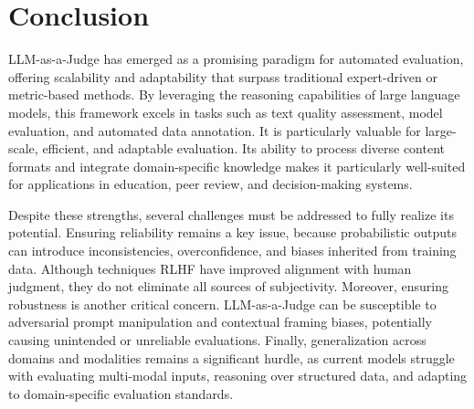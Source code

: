 \documentclass[acmsmall,screen]{acmart}
\begin{document}
\section{Conclusion}\label{sec:conclusion}


LLM-as-a-Judge has emerged as a promising paradigm for automated evaluation, offering scalability and adaptability that surpass traditional expert-driven or metric-based methods. By leveraging the reasoning capabilities of large language models, this framework excels in tasks such as text quality assessment, model evaluation, and automated data annotation. It is particularly valuable for large-scale, efficient, and adaptable evaluation. Its ability to process diverse content formats and integrate domain-specific knowledge makes it particularly well-suited for applications in education, peer review, and decision-making systems.

Despite these strengths, several challenges must be addressed to fully realize its potential. Ensuring reliability remains a key issue, because probabilistic outputs can introduce inconsistencies, overconfidence, and biases inherited from training data. Although techniques RLHF have improved alignment with human judgment, they do not eliminate all sources of subjectivity. Moreover, ensuring robustness is another critical concern. LLM-as-a-Judge can be susceptible to adversarial prompt manipulation and contextual framing biases, potentially causing unintended or unreliable evaluations. Finally, generalization across domains and modalities remains a significant hurdle, as current models struggle with evaluating multi-modal inputs, reasoning over structured data, and adapting to domain-specific evaluation standards.
\end{document}
